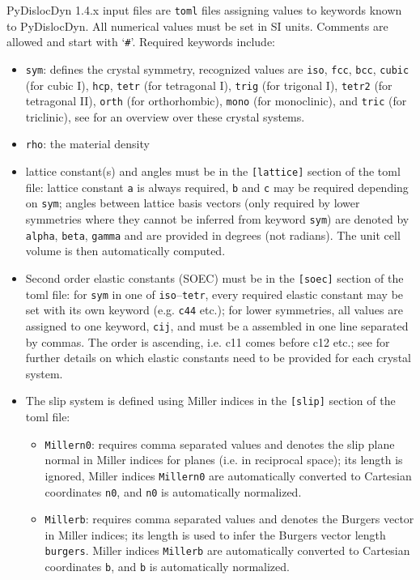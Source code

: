 \documentclass[11pt,letterpaper,oneside]{article}
\begin{document}
PyDislocDyn 1.4.x input files are \verb|toml| files assigning values to keywords known to PyDislocDyn.
All numerical values must be set in SI units.
Comments are allowed and start with `\verb|#|'.
Required keywords include:
\begin{itemize}
\item \verb|sym|: defines the crystal symmetry, recognized values are \verb|iso|, \verb|fcc|, \verb|bcc|, \verb|cubic| (for cubic I), \verb|hcp|, \verb|tetr| (for tetragonal I), \verb|trig| (for trigonal I), \verb|tetr2| (for tetragonal II), \verb|orth| (for orthorhombic), \verb|mono| (for monoclinic), and \verb|tric| (for triclinic), see \cite{Brugger:1965} for an overview over these crystal systems.

\item \verb|rho|: the material density

\item lattice constant(s) and angles must be in the \verb|[lattice]| section of the toml file: lattice constant \verb|a| is always required, \verb|b| and \verb|c| may be required depending on \verb|sym|; angles between lattice basis vectors (only required by lower symmetries where they cannot be inferred from keyword \verb|sym|) are denoted by \verb|alpha|, \verb|beta|, \verb|gamma| and are provided in degrees (not radians).
The unit cell volume is then automatically computed.

\item Second order elastic constants (SOEC) must be in the \verb|[soec]| section of the toml file: for \verb|sym| in one of \verb|iso|--\verb|tetr|, every required elastic constant may be set with its own keyword (e.g. \verb|c44| etc.);
for lower symmetries, all values are assigned to one keyword, \verb|cij|, and must be a assembled in one line separated by commas.
The order is ascending, i.e. c11 comes before c12 etc.; see \cite{Brugger:1965} for further details on which elastic constants need to be provided for each crystal system.

\item The slip system is defined using Miller indices in the \verb|[slip]| section of the toml file:
\begin{itemize}
\item \verb|Millern0|: requires comma separated values and denotes the slip plane normal in Miller indices for planes (i.e. in reciprocal space); its length is ignored, Miller indices \verb|Millern0| are automatically converted to Cartesian coordinates \verb|n0|, and \verb|n0| is automatically normalized.

\item \verb|Millerb|: requires comma separated values and denotes the Burgers vector in Miller indices; its length is used to infer the Burgers vector length \verb|burgers|.
Miller indices \verb|Millerb| are automatically converted to Cartesian coordinates \verb|b|, and \verb|b| is automatically normalized.
\end{itemize}
\end{itemize}
\end{document}
